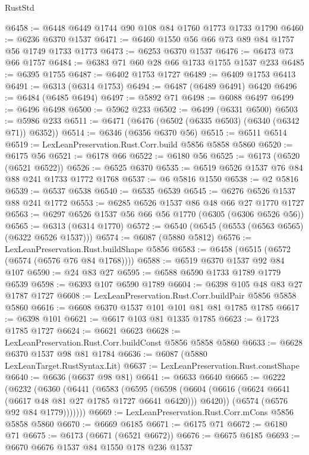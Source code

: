 \begin{lexlean}{RustStd}
\begin{coremodule}
@6458 := @6448 @6449 @1744 @90 @108 @84 @1760 @1773 @1733 @1790
@6460 := @6236 @6370 @1537
@6471 := @6460 @1550 @56 @66 @73 @89 @84 @1757 @56 @1749 @1733 @1773
@6473 := @6253 @6370 @1537
@6476 := @6473 @73 @66 @1757
@6484 := @6383 @71 @60 @28 @66 @1733 @1755 @1537 @233
@6485 := @6395 @1755
@6487 := @6402 @1753 @1727
@6489 := @6409 @1753 @6413
@6491 := @6313 (@6314 @1753)
@6494 := @6487 (@6489 @6491) @6420
@6496 := @6484 (@6485 @6494)
@6497 := @5892 @71
@6498 := @6088 @6497
@6499 := @6496 @6498
@6500 := @5962 @233
@6502 := @6499 (@6331 @6500)
@6503 := @5986 @233
@6511 := @6471 (@6476 (@6502 (@6335 @6503) (@6340 (@6342 @71)) @6352))
@6514 := @6346 (@6356 @6370 @56)
@6515 := @6511 @6514
@6519 := LexLeanPreservation.Rust.Corr.build @5856 @5858 @5860
@6520 := @6175 @56
@6521 := @6178 @66
@6522 := @6180 @56
@6525 := @6173 (@6520 (@6521 @6522))
@6526 := @6525 @6370
@6535 := @6519 @6526 @1537 @76 @84 @88 @241 @1733 @1772 @1768
@6537 := @6 @5816 @1550
@6538 := @2 @5816
@6539 := @6537 @6538
@6540 := @6535 @6539
@6545 := @6276 @6526 @1537 @88 @241 @1772
@6553 := @6285 @6526 @1537 @86 @48 @66 @27 @1770 @1727
@6563 := @6297 @6526 @1537 @56 @66 @56 @1770 (@6305 (@6306 @6526 @56))
@6565 := @6313 (@6314 @1770)
@6572 := @6540 (@6545 (@6553 (@6563 @6565) (@6322 @6526 @1537)))
@6574 := @6087 (@5880 @5812)
@6576 := LexLeanPreservation.Rust.buildShape @5856
@6583 := @6458 (@6515 (@6572 (@6574 (@6576 @76 @84 @1768))))
@6588 := @6519 @6370 @1537 @92 @84 @107
@6590 := @24 @83 @27
@6595 := @6588 @6590 @1733 @1789 @1779 @6539
@6598 := @6393 @107 @6590 @1789
@6604 := @6398 @105 @48 @83 @27 @1787 @1727
@6608 := LexLeanPreservation.Rust.Corr.buildPair @5856 @5858 @5860
@6616 := @6608 @6370 @1537 @101 @101 @81 @81 @1785 @1785
@6617 := @6398 @101
@6621 := @6617 @103 @81 @1335 @1785
@6623 := @1723 @1785 @1727
@6624 := @6621 @6623
@6628 := LexLeanPreservation.Rust.Corr.buildConst @5856 @5858 @5860
@6633 := @6628 @6370 @1537 @98 @81 @1784
@6636 := @6087 (@5880 LexLeanTarget.RustSyntax.Lit)
@6637 := LexLeanPreservation.Rust.constShape
@6640 := @6636 (@6637 @98 @81)
@6641 := @6633 @6640
@6665 := @6222
    (@6232
      (@6360
        (@6441
          (@6583
            (@6595
              (@6598
                (@6604 (@6616 (@6624 @6641 (@6617 @48 @81 @27 @1785 @1727 @6641 @6420))) @6420))
              (@6574 (@6576 @92 @84 @1779)))))))
@6669 := LexLeanPreservation.Rust.Corr.mCons @5856 @5858 @5860
@6670 := @6669 @6185
@6671 := @6175 @71
@6672 := @6180 @71
@6675 := @6173 (@6671 (@6521 @6672))
@6676 := @6675 @6185
@6693 := @6670
    @6676
    @1537
    @84
    @1550
    @178
    @236
    @1537

\end{coremodule}
\end{lexlean}
